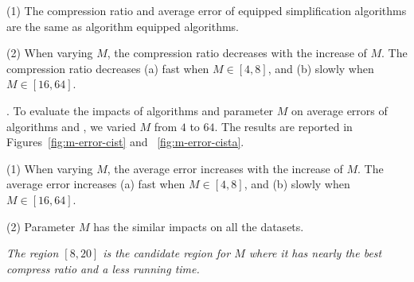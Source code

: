 \ni(1) The compression ratio and average error of \rpia equipped simplification algorithms are the same as algorithm \cpia equipped algorithms.

\ni(2) When varying $M$, the compression ratio decreases with the increase of $M$.
The compression ratio decreases (a) fast when $M \in [4,8]$, and (b) slowly when $M \in [16, 64]$.


.
To evaluate the impacts of algorithms \rpia and parameter $M$ on average errors of algorithms \cist and \cista, we varied $M$ from $4$ to $64$.
The results are reported in Figures~\ref{fig:m-error-cist} and ~\ref{fig:m-error-cista}.


\ni(1) When varying $M$, the average error increases with the increase of $M$.
The average error increases (a) fast when $M \in [4,8]$, and (b) slowly when $M \in [16, 64]$.

\ni(2) Parameter $M$ has the similar impacts on all the datasets.

\emph{The region $[8, 20]$ is the candidate region for $M$ where it has nearly the best compress ratio and a less running time.}








